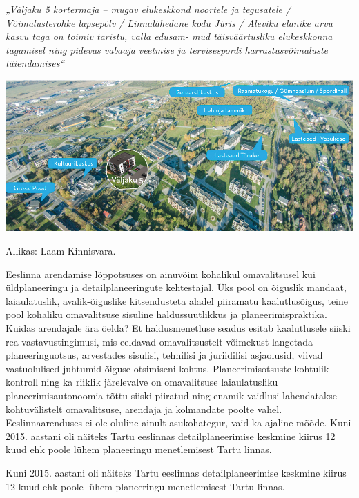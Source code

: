 \documentclass[estonian,]{article}
\begin{document}
\emph{„Väljaku 5 kortermaja -- mugav elukeskkond noortele ja tegusatele / Võimalusterohke lapsepõlv / Linnalähedane kodu Jüris / Aleviku elanike arvu kasvu taga on toimiv taristu, valla edusam- mud täisväärtusliku elukeskkonna tagamisel ning pidevas vabaaja veetmise ja tervisespordi harrastusvõimaluste täiendamises``}

\begin{center}\includegraphics[width=0.9\linewidth]{figures/1-chapter/fig138} \end{center}

\begin{imgsource}
{Allikas:} Laam Kinnisvara.
\end{imgsource}

Eeslinna arendamise lõppotsuses on ainuvõim kohalikul omavalitsusel kui üldplaneeringu ja detailplaneeringute kehtestajal. Üks pool on õiguslik mandaat, laiaulatuslik, avalik-õiguslike kitsendusteta aladel piiramatu kaalutlusõigus, teine pool kohaliku omavalitsuse sisuline haldussuutlikkus ja planeerimispraktika. Kuidas arendajale ära öelda? Et haldusmenetluse seadus esitab kaalutlusele siiski rea vastavustingimusi, mis eeldavad omavalitsustelt võimekust langetada planeeringuotsus, arvestades sisulisi, tehnilisi ja juriidilisi asjaolusid, viivad vastuolulised juhtumid õiguse otsimiseni kohtus. Planeerimisotsuste kohtulik kontroll ning ka riiklik järelevalve on omavalitsuse laiaulatusliku planeerimisautonoomia tõttu siiski piiratud ning enamik vaidlusi lahendatakse kohtuvälistelt omavalitsuse, arendaja ja kolmandate poolte vahel. Eeslinnaarenduses ei ole oluline ainult asukohategur, vaid ka ajaline mõõde. Kuni 2015. aastani oli näiteks Tartu eeslinnas detailplaneerimise keskmine kiirus 12 kuud ehk poole lühem planeeringu menetlemisest Tartu linnas.

\begin{blockquote-right}
Kuni 2015. aastani oli näiteks Tartu eeslinnas detailplaneerimise
keskmine kiirus 12 kuud ehk poole lühem planeeringu menetlemisest Tartu
linnas.
\end{blockquote-right}
\end{document}
